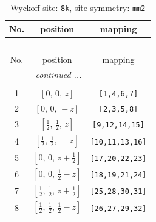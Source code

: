 \documentclass[fleqn,8pt]{jsarticle}
\begin{document}
\begin{longtable}{ccc}
\caption{Wyckoff site: {\tt 8k}, site symmetry: {\tt mm2}}
 \\
 \hline \hline
No. & position & mapping \\ \hline \endfirsthead

\multicolumn{2}{l}{\tablename\ \thetable{}} \\
 \hline \hline
No. & position & mapping \\ \hline \endhead

 \hline \hline
\multicolumn{2}{r}{\footnotesize\it continued ...} \\ \endfoot

 \hline \hline
\multicolumn{2}{r}{} \\ \endlastfoot

1 & $\left[ 0,\, 0,\, z \right]$ & {\tt [1,4,6,7]} \\ \hline
2 & $\left[ 0,\, 0,\, - z \right]$ & {\tt [2,3,5,8]} \\ \hline
3 & $\left[ \frac{1}{2},\, \frac{1}{2},\, z \right]$ & {\tt [9,12,14,15]} \\ \hline
4 & $\left[ \frac{1}{2},\, \frac{1}{2},\, - z \right]$ & {\tt [10,11,13,16]} \\ \hline
5 & $\left[ 0,\, 0,\, z + \frac{1}{2} \right]$ & {\tt [17,20,22,23]} \\ \hline
6 & $\left[ 0,\, 0,\, \frac{1}{2} - z \right]$ & {\tt [18,19,21,24]} \\ \hline
7 & $\left[ \frac{1}{2},\, \frac{1}{2},\, z + \frac{1}{2} \right]$ & {\tt [25,28,30,31]} \\ \hline
8 & $\left[ \frac{1}{2},\, \frac{1}{2},\, \frac{1}{2} - z \right]$ & {\tt [26,27,29,32]} \\
\end{longtable}
\renewcommand{\arraystretch}{1.2}
\end{document}
